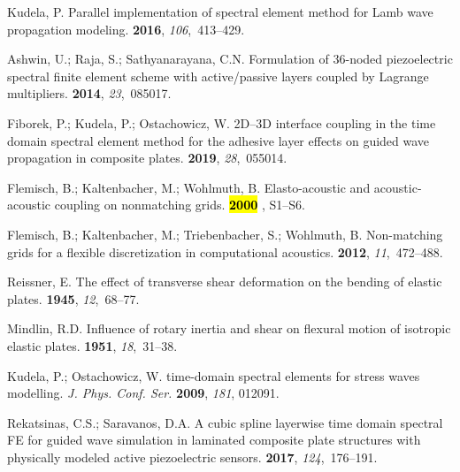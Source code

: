 \documentclass[sensors,article,accept,moreauthors,pdftex]{Definitions/mdpi}
\begin{document}
\begin{thebibliography}{999}
Kudela, P.
\newblock Parallel implementation of spectral element method for Lamb wave
  propagation modeling.
 {\bf 2016}, {\em 106},~413--429.

Ashwin, U.; Raja, S.; Sathyanarayana, C.N.
\newblock Formulation of 36-noded piezoelectric spectral finite element scheme
  with active/passive layers coupled by {Lagrange} multipliers.
 {\bf 2014}, {\em 23},~085017.

Fiborek, P.; Kudela, P.; Ostachowicz, W.
\newblock 2D--3D interface coupling in the time domain spectral element method
  for the adhesive layer effects on guided wave propagation in composite
  plates.
 {\bf 2019}, {\em 28},~055014.

Flemisch, B.; Kaltenbacher, M.; Wohlmuth, B.
\newblock Elasto-acoustic and acoustic-acoustic coupling on nonmatching grids.
 {\bf \hl{2000}%
},  S1--S6.

Flemisch, B.; Kaltenbacher, M.; Triebenbacher, S.; Wohlmuth, B.
\newblock Non-matching grids for a flexible discretization in computational
  acoustics.
 {\bf 2012}, {\em 11},~472--488.

Reissner, E.
\newblock The effect of transverse shear deformation on the bending of elastic
  plates.
 {\bf 1945}, {\em 12},~68--77.

Mindlin, R.D.
\newblock Influence of rotary inertia and shear on flexural motion of isotropic
  elastic plates.
 {\bf 1951}, {\em 18},~31--38.

Kudela, P.; Ostachowicz, W.
 time-domain spectral elements for stress waves modelling.
\newblock  \emph{J. Phys. Conf. Ser.}  \textbf{2009}, \emph{181}, 012091.

Rekatsinas, C.S.; Saravanos, D.A.
\newblock A cubic spline layerwise time domain spectral FE for guided wave
  simulation in laminated composite plate structures with physically modeled
  active piezoelectric sensors.
 {\bf 2017}, {\em 124},~176--191.


\end{thebibliography}
\end{document}
